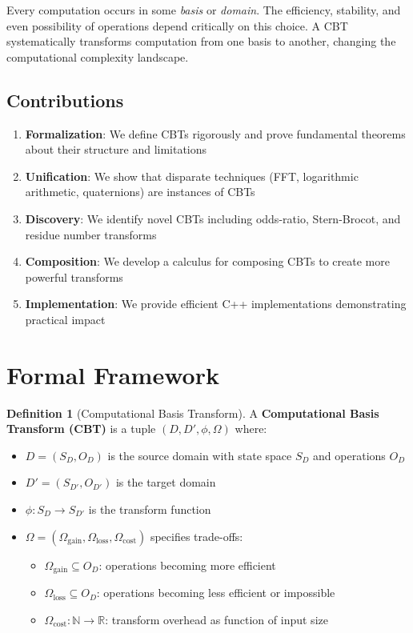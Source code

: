 \documentclass[12pt,a4paper]{article}
\theoremstyle{definition}
\newtheorem{definition}{Definition}
\begin{document}
Every computation occurs in some \textit{basis} or \textit{domain}. The efficiency, stability, and even possibility of operations depend critically on this choice. A CBT systematically transforms computation from one basis to another, changing the computational complexity landscape.

\subsection{Contributions}

\begin{enumerate}
\item \textbf{Formalization}: We define CBTs rigorously and prove fundamental theorems about their structure and limitations
\item \textbf{Unification}: We show that disparate techniques (FFT, logarithmic arithmetic, quaternions) are instances of CBTs
\item \textbf{Discovery}: We identify novel CBTs including odds-ratio, Stern-Brocot, and residue number transforms
\item \textbf{Composition}: We develop a calculus for composing CBTs to create more powerful transforms
\item \textbf{Implementation}: We provide efficient C++ implementations demonstrating practical impact
\end{enumerate}

\section{Formal Framework}

\begin{definition}[Computational Basis Transform]
A \textbf{Computational Basis Transform (CBT)} is a tuple $(D, D', \phi, \Omega)$ where:
\begin{itemize}
\item $D = (S_D, O_D)$ is the source domain with state space $S_D$ and operations $O_D$
\item $D' = (S_{D'}, O_{D'})$ is the target domain
\item $\phi: S_D \to S_{D'}$ is the transform function
\item $\Omega = (\Omega_{\text{gain}}, \Omega_{\text{loss}}, \Omega_{\text{cost}})$ specifies trade-offs:
  \begin{itemize}
  \item $\Omega_{\text{gain}} \subseteq O_D$: operations becoming more efficient
  \item $\Omega_{\text{loss}} \subseteq O_D$: operations becoming less efficient or impossible
  \item $\Omega_{\text{cost}}: \mathbb{N} \to \mathbb{R}$: transform overhead as function of input size
  \end{itemize}
\end{itemize}
\end{definition}
\end{document}

